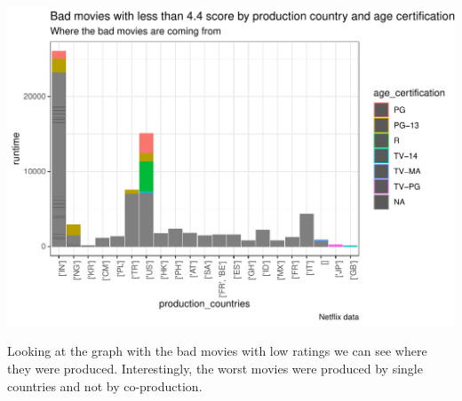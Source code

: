 \documentclass[11pt,preprint, authoryear]{elsarticle}
\let\origfigure\figure
\let\endorigfigure\endfigure
\renewenvironment{figure}[1][2] {
    \expandafter\origfigure\expandafter[H]
} {
    \endorigfigure
}
\numberwithin{equation}{section}
\numberwithin{figure}{section}
\numberwithin{table}{section}
\begin{document}
\begin{figure}[H]

{\centering \includegraphics{Q4_files/figure-latex/unnamed-chunk-5-1} 

}

\caption{Bad movies.\label{Figure2}}\label{fig:unnamed-chunk-5}
\end{figure}

Looking at the graph with the bad movies with low ratings we can see
where they were produced. Interestingly, the worst movies were produced
by single countries and not by co-production.


\end{document}

